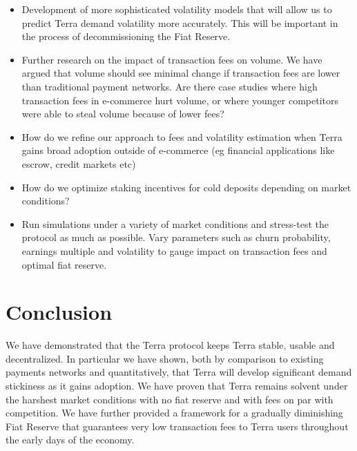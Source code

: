 \documentclass{article}
\begin{document}
\begin{itemize}
    \item Development of more sophisticated volatility models that will allow us to predict Terra demand volatility more accurately. This will be important in the process of decommissioning the Fiat Reserve.
    
    \item Further research on the impact of transaction fees on volume. We have argued that volume should see minimal change if transaction fees are lower than traditional payment networks. Are there case studies where high transaction fees in e-commerce hurt volume, or where younger competitors were able to steal volume because of lower fees?
    
    \item How do we refine our approach to fees and volatility estimation when Terra gains broad adoption outside of e-commerce (eg financial applications like escrow, credit markets etc)
    
    \item How do we optimize staking incentives for cold deposits depending on market conditions?
    
    \item Run simulations under a variety of market conditions and stress-test the protocol as much as possible. Vary parameters such as churn probability, earnings multiple and volatility to gauge impact on transaction fees and optimal fiat reserve.
\end{itemize}


\section{Conclusion}

We have demonstrated that the Terra protocol keeps Terra stable, usable and decentralized. In particular we have shown, both by comparison to existing payments networks and quantitatively, that Terra will develop significant demand stickiness as it gains adoption. We have proven that Terra remains solvent under the harshest market conditions with no fiat reserve and with fees on par with competition. We have further provided a framework for a gradually diminishing Fiat Reserve that guarantees very low transaction fees to Terra users throughout the early days of the economy.
\end{document}

